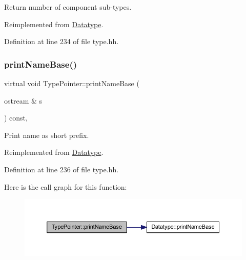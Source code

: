 Return number of component sub-\/types. 



Reimplemented from \mbox{\hyperlink{class_datatype_ad29076ac4c3a28363df8f700c6fe4ffd}{Datatype}}.



Definition at line 234 of file type.\+hh.

\mbox{\label{class_type_pointer_a843f2ebe62187fe48a0f3d1b9bd9c10b}} 
\subsubsection{\texorpdfstring{printNameBase()}{printNameBase()}}
{\footnotesize\ttfamily virtual void Type\+Pointer\+::print\+Name\+Base (\begin{DoxyParamCaption}\item[{ostream \&}]{s }\end{DoxyParamCaption}) const\hspace{0.3cm}{\ttfamily [inline]}, {\ttfamily [virtual]}}



Print name as short prefix. 



Reimplemented from \mbox{\hyperlink{class_datatype_aec50467c2d81d22daf052a95e283a24a}{Datatype}}.



Definition at line 236 of file type.\+hh.

Here is the call graph for this function\+:
\nopagebreak
\begin{figure}[H]
\begin{center}
\leavevmode
\includegraphics[width=350pt]{class_type_pointer_a843f2ebe62187fe48a0f3d1b9bd9c10b_cgraph}
\end{center}
\end{figure}
\mbox{\label{class_type_pointer_a0aece76a1fd245a58d75136ca81fca1b}} 

